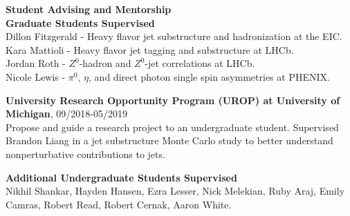\documentclass[11pt]{article}
\begin{document}

\vspace{7pt}










\begin{flushleft}
\Large \textbf{Student Advising and Mentorship}\\
\normalsize
\vspace{0.3cm}
\textbf{Graduate Students Supervised}\\
Dillon Fitzgerald - Heavy flavor jet substructure and hadronization at the EIC. \\
Kara Mattioli - Heavy flavor jet tagging and substructure at LHCb. \\
Jordan Roth - $Z^0$-hadron and $Z^0$-jet correlations at LHCb. \\
Nicole Lewis - $\pi^0$, $\eta$, and direct photon single spin asymmetries at PHENIX. \\

\vspace{0.5cm}

\textbf{University Research Opportunity Program (UROP) at University of Michigan}, 09/2018-05/2019\\
Propose and guide a research project to an undergraduate student. Supervised Brandon Liang in a jet substructure Monte Carlo study to better understand nonperturbative contributions to jets.\\
\vspace*{0.3cm}

\textbf{Additional Undergraduate Students Supervised}\\
Nikhil Shankar, Hayden Hansen, Ezra Lesser, Nick Melekian, Ruby Araj, Emily Camras, Robert Read, Robert Cernak, Aaron White.
\end{flushleft}
\end{document}
